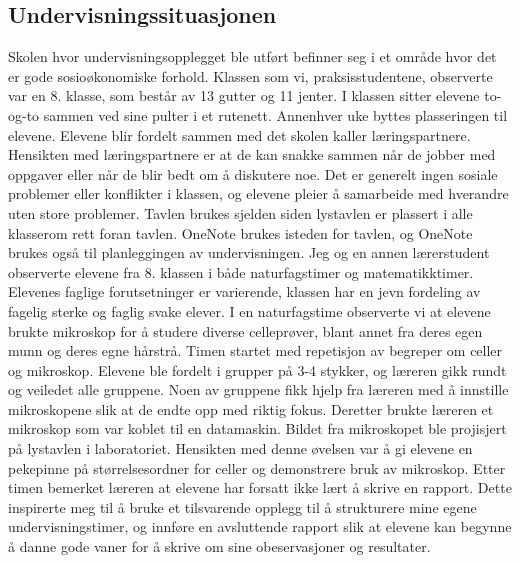 \documentclass[main.tex]{subfiles}
\begin{document}
\subsection*{Undervisningssituasjonen}
Skolen hvor undervisningsopplegget ble utført befinner seg i et område hvor det er gode 
sosioøkonomiske forhold. Klassen som vi, praksisstudentene, observerte var en 8. klasse, som består 
av 13 gutter og 11 jenter. I klassen sitter elevene to-og-to sammen ved sine pulter i et rutenett. 
Annenhver uke byttes plasseringen til elevene. Elevene blir fordelt sammen med det skolen kaller 
læringspartnere. Hensikten med læringspartnere er at de kan snakke sammen når de jobber med oppgaver 
eller når de blir bedt om å diskutere noe.  Det er generelt ingen sosiale problemer 
eller konflikter i klassen, og elevene pleier å samarbeide med hverandre uten store problemer. Tavlen 
brukes sjelden siden lystavlen er plassert i alle klasserom rett foran tavlen. OneNote brukes isteden 
for tavlen, og OneNote brukes også til planleggingen av undervisningen.
\newline
\newline
Jeg og en annen lærerstudent observerte elevene fra 8. klassen i både naturfagstimer og 
matematikktimer. Elevenes faglige forutsetninger er varierende, klassen har en jevn fordeling av 
fagelig sterke og faglig svake elever. I en naturfagstime observerte vi at elevene brukte mikroskop 
for å studere diverse celleprøver, blant annet fra deres egen munn og deres egne hårstrå. Timen 
startet med repetisjon av begreper om celler og mikroskop. Elevene ble fordelt i grupper på 3-4 
stykker, og læreren gikk rundt og veiledet alle gruppene. Noen av gruppene fikk 
hjelp fra læreren med å innstille mikroskopene slik at de endte opp med riktig fokus. Deretter brukte 
læreren et mikroskop som var koblet til en datamaskin. Bildet fra mikroskopet ble projisjert på 
lystavlen i laboratoriet. Hensikten med denne øvelsen var å gi elevene en pekepinne på 
størrelsesordner for celler og demonstrere bruk av mikroskop. Etter timen bemerket læreren at 
elevene har forsatt ikke lært å skrive en rapport. Dette inspirerte meg til å bruke et tilsvarende 
opplegg til å strukturere mine egene undervisningstimer, og innføre en avsluttende rapport 
slik at elevene kan begynne å danne gode vaner for å skrive om sine obeservasjoner og resultater.
\end{document}
